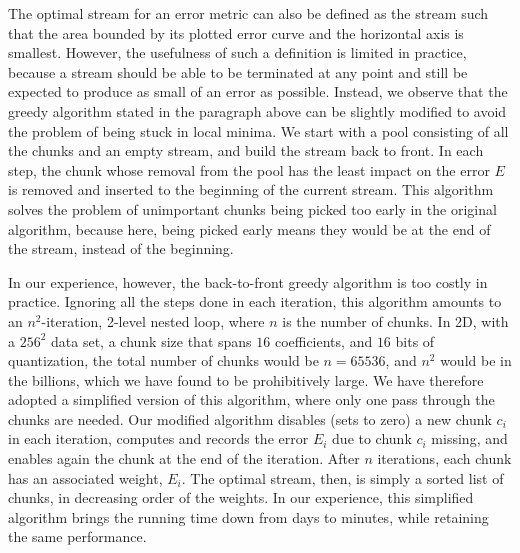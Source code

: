 The optimal stream for an error metric can also be defined as the stream such that the area bounded
by its plotted error curve and the horizontal axis is smallest. However, the usefulness of such a
definition is limited in practice, because a stream should be able to be terminated at any point and
still be expected to produce as small of an error as possible. Instead, we observe that the greedy
algorithm stated in the paragraph above can be slightly modified to avoid the problem of being stuck
in local minima. We start with a pool consisting of all the chunks and an empty stream, and build
the stream back to front. In each step, the chunk whose removal from the pool has the least impact
on the error $E$ is removed and inserted to the beginning of the current stream. This algorithm
solves the problem of unimportant chunks being picked too early in the original algorithm, because
here, being picked early means they would be at the end of the stream, instead of the beginning.

In our experience, however, the back-to-front greedy algorithm is too costly in practice. Ignoring
all the steps done in each iteration, this algorithm amounts to an $n^2$-iteration, 2-level nested
loop, where $n$ is the number of chunks. In 2D, with a $256^2$ data set, a chunk size that spans
$16$ coefficients, and $16$ bits of quantization, the total number of chunks would be $n=65536$, and
$n^2$ would be in the billions, which we have found to be prohibitively large. We have therefore
adopted a simplified version of this algorithm, where only one pass through the chunks are needed.
Our modified algorithm disables (sets to zero) a new chunk $c_i$ in each iteration, computes and
records the error $E_i$ due to chunk $c_i$ missing, and enables again the chunk at the end of the
iteration. After $n$ iterations, each chunk has an associated weight, $E_i$. The optimal stream,
then, is simply a sorted list of chunks, in decreasing order of the weights. In our experience, this
simplified algorithm brings the running time down from days to minutes, while retaining the same
performance.

